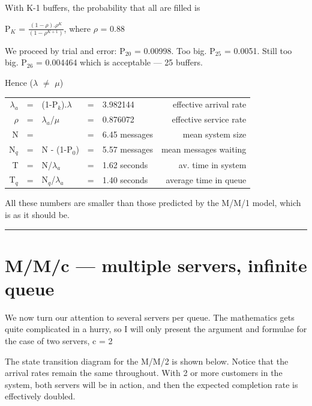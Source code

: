 \documentclass[12pt,fleqn]{report}
\begin{document}
\begin{enumerate}
With K-1 buffers, the probability that all are filled is

\begin{center}
P$_K$ = $\frac{(1-\rho).\rho^K}{(1-\rho^{K+1})}$, where $\rho$ = 0.88
\end{center}

We proceed by trial and error: P$_{20}$ = 0.00998. Too big.
P$_{25}$ = 0.0051. Still too big.
P$_{26}$ = 0.004464 which is acceptable --- 25 buffers.

Hence ($\lambda$ $\neq$ $\mu$)

\begin{tabular}{ r c l c l r}
$\lambda_a$  & = & (1-P$_k$).$\lambda$ & = & 3.982144 & effective
arrival rate\\
$\rho$       & = & $\lambda_a$/$\mu$   & = & 0.876072 & effective
service rate\\
N     & = &                   & = & 6.45 messages   & mean system size    \\
N$_q$ & = & N - (1-P$_0$)     & = & 5.57 messages   & mean messages waiting  \\
T     & = & N/$\lambda_a$     & = & 1.62 seconds    & av. time in system   \\
T$_q$ & = & N$_q$/$\lambda_a$ & = & 1.40 seconds    & average time in queue\\
\end{tabular}

All these numbers are smaller than those predicted by the M/M/1 model, 
which is as it should be.

\end{enumerate}

\noindent
\rule{160mm}{0.5mm} 

\newpage

\section{M/M/c --- multiple servers, infinite queue}

We now turn our attention to several servers per queue.
The mathematics gets quite complicated in a hurry,
so I will only present the argument and formulae
for the case of two servers, c = 2

The state transition diagram for the M/M/2 is shown
below. Notice that the arrival rates remain the same throughout.
With 2 or more customers in the system, both servers will be in
action, and then the expected completion rate is effectively doubled.
\end{document}
